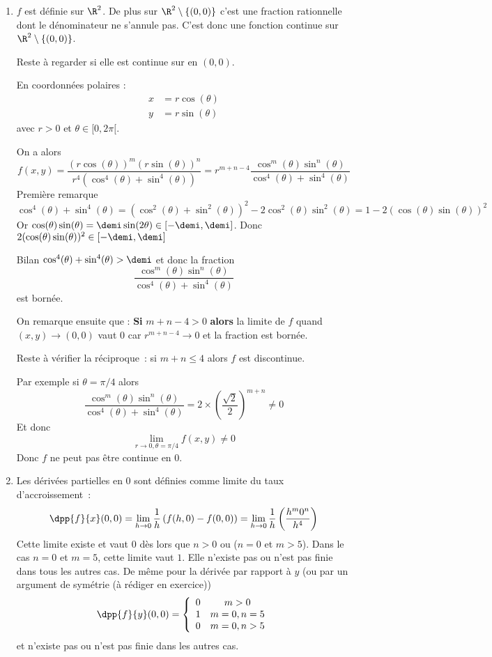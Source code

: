 \documentclass{article}
\begin{document}
\begin{enumerate}
\item $f$ est définie sur $\R^2$. De plus sur $\R^2 \setminus \{(0,0)\}$ c'est une fraction rationnelle dont le dénominateur ne s'annule pas. C'est donc une fonction continue sur $\R^2 \setminus \{(0,0)\}$.

Reste à regarder si elle est continue sur en $(0,0)$.

En coordonnées polaires :
\begin{align*}
x &= r\cos(\theta)\\
y &= r\sin(\theta)
\end{align*}	
 avec $r>0$ et $\theta \in [0,2\pi[$.
 
On a alors
\[
f(x,y) = \dfrac{(r\cos(\theta))^m(r\sin(\theta))^n}{r^4(\cos^4(\theta)+\sin^4(\theta))}
= r^{m+n-4} \dfrac{\cos^m(\theta)\sin^n(\theta)}{\cos^4(\theta)+\sin^4(\theta)}
\]
Première remarque 
\[
\cos^4(\theta)+\sin^4(\theta) = (\cos^2(\theta) + \sin^2(\theta))^2 - 2\cos^2(\theta)\sin^2(\theta) = 1 - 2(\cos(\theta)\sin(\theta))^2
\]
Or $\cos(\theta)\sin(\theta) = \demi\sin(2\theta) \in [-\demi,\demi]$. Donc $2(\cos(\theta)\sin(\theta))^2 \in  [-\demi,\demi]$

Bilan $\cos^4(\theta)+\sin^4(\theta) > \demi$ et donc la fraction
\[
\dfrac{\cos^m(\theta)\sin^n(\theta)}{\cos^4(\theta)+\sin^4(\theta)}
\] 
est bornée.

On remarque ensuite que : \textbf{Si} $m+n-4 > 0$ \textbf{alors} la limite de $f$ quand $(x,y) \to (0,0)$ vaut $0$ car $r^{m+n-4} \to 0$ et la fraction est bornée.

Reste à vérifier la réciproque~: si $m+n \leq 4$ alors $f$ est discontinue.

Par exemple si $\theta = \pi/4$ alors  
\[
\dfrac{\cos^m(\theta)\sin^n(\theta)}{\cos^4(\theta)+\sin^4(\theta)} = 2 \times \left(\dfrac{\sqrt{2}}{2}\right)^{m+n} \neq 0
\]
Et donc 
\[
\underset{r\to 0, \theta = \pi/4}{\lim} f(x,y) \neq 0
\]
Donc $f$ ne peut pas être continue en $0$.

\item Les dérivées partielles en $0$ sont définies comme limite du taux d'accroissement~:
\[
\dpp{f}{x}(0,0)= \lim_{h \to 0} \dfrac{1}{h} \left( f(h,0)  - f(0,0) \right) = \lim_{h \to 0} \dfrac{1}{h} \left(\dfrac{h^m0^n}{h^4} \right)
\]
Cette limite existe et vaut $0$ dès lors que $n>0$ ou ($n=0$ et $m>5$). Dans le cas $n=0$ et $m=5$, cette limite vaut $1$. Elle n'existe pas ou n'est pas finie dans tous les autres cas.
De même pour la dérivée par rapport à $y$ (ou par un argument de symétrie (à rédiger en exercice))
\[
\dpp{f}{y}(0,0) = \left\lbrace
\begin{array}{cc}
0 & m>0 \\ 
1 & m=0, n=5 \\ 
0 & m=0, n> 5
\end{array} 
\right.
\]
et n'existe pas ou n'est pas finie dans les autres cas.


\end{enumerate}
\end{document}
